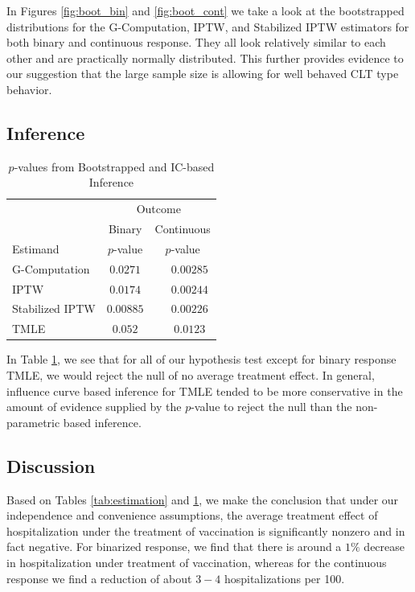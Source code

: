 \documentclass[english, 12pt]{article}
\begin{document}
In Figures \ref{fig:boot_bin} and \ref{fig:boot_cont} we take a look at the bootstrapped distributions for the G-Computation, IPTW, and Stabilized IPTW estimators for both binary and continuous response. They all look relatively similar to each other and are practically normally distributed. This further provides evidence to our suggestion that the large sample size is allowing for well behaved CLT type behavior.

\subsection{Inference}
\begin{table}
\begin{center}
\begin{tabular}{lcc}
\toprule
 & \multicolumn{2}{c}{Outcome} \\ \cmidrule(lr){2-3}
 & \multicolumn{1}{c}{Binary} & \multicolumn{1}{c}{Continuous} \\ \cmidrule(lr){2-2}\cmidrule(lr){3-3}
Estimand  & $p$-value & $p$-value \\ 
\midrule
G-Computation  & $0.0271$ & $\phantom{-}0.00285$ \\
IPTW  & $0.0174$ & $\phantom{-}0.00244$ \\
Stabilized IPTW  & $0.00885$ & $\phantom{-}0.00226$ \\
TMLE & $0.052$ & $\phantom{-}0.0123$ \\
\bottomrule 
\end{tabular}
\caption{$p$-values from Bootstrapped and IC-based Inference}
\label{tab:inference}
\end{center}
\end{table}
In Table \ref{tab:inference}, we see that for all of our hypothesis test except for binary response TMLE, we would reject the null of no average treatment effect. In general, influence curve based inference for TMLE tended to be more conservative in the amount of evidence supplied by the $p$-value to reject the null than the non-parametric based inference. 

\subsection{Discussion}
Based on Tables \ref{tab:estimation} and \ref{tab:inference}, we make the conclusion that under our independence and convenience assumptions, the average treatment effect of hospitalization under the treatment of vaccination is significantly nonzero and in fact negative. For binarized response, we find that there is around a $1\%$ decrease in hospitalization under treatment of vaccination, whereas for the continuous response we find a reduction of about $3-4$ hospitalizations per 100.
\end{document}
